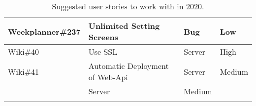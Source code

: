 \begin{longtable}{|p{2.9cm}|p{7cm}|p{1.4cm}|p{1.5cm}|}
    Weekplanner\#237 & Unlimited Setting Screens                                                                                                                                                 & Bug        & Low   \\ \hline
    Wiki\#40         & Use SSL                                                                                                                                                                   & Server     & High  \\ \hline
    Wiki\#41         & Automatic Deployment of Web-Api                                                                                                                                           & Server     & Medium     \\ \hline                                                                                                                                       & Server     & Medium  \\ \hline                                                                                                                                      
    \caption{Suggested user stories to work with in 2020.}
\end{longtable}
